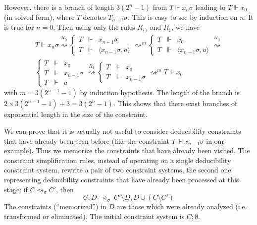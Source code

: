 \documentclass[acmtocl,acmnow]{acmtrans2m}
\newcommand{\simpl}{\rightsquigarrow}   \newcommand{\msimpl}{\rightsquigarrow}  \newcommand{\gsimpl}{\leadsto}
\newcommand{\dedsys}[1]{deducibility constraint system}
\newcommand{\dedconss}[1]{deducibility constraints}
\begin{document}
However, there is a branch of length $3(2^n-1)$ from $T\Vdash x_n\sigma$ leading to $T\Vdash x_0$ (in solved
form), where $T$ denotes $T_{n+1}\sigma$.
This is easy to see by induction on $n$.
It is true for $n = 0$. Then using only the rules
$R_{\langle\,\rangle}$ and $R_1$, we have
\begin{multline*}
T\Vdash x_{n}\sigma\stackrel{R_{\langle\rangle}}{\simpl}
\left\{\begin{array}{rcl}
T&\Vdash& x_{n-1}\sigma\\
T&\Vdash &\langle x_{n-1}\sigma,a\rangle
       \end{array}\right.
\simpl^m
\left\{\begin{array}{rcl}
T&\Vdash& x_{0}\\
T&\Vdash& \langle x_{n-1}\sigma,a\rangle
       \end{array}\right.
\stackrel{R_{\langle\rangle}}{\simpl}\\
\left\{\begin{array}{rcl}
T&\Vdash &x_{0}\\
T&\Vdash &x_{n-1}\sigma\\
T&\Vdash &a
       \end{array}\right.
\stackrel{R_{1}}{\simpl}
\left\{\begin{array}{rcl}
T&\Vdash &x_{0}\\
T&\Vdash &x_{n-1}\sigma
       \end{array}\right.
\simpl^m T\Vdash x_{0}
\end{multline*}
with $m= 3(2^{n-1}-1)$ by induction hypothesis. The length of the branch is
$2\times 3(2^{n-1}-1)+3= 3(2^{n}-1)$.
This shows that there exist branches of exponential length in the size
of the constraint.







\bigskip

We can prove that it is
actually not useful to consider \dedconss{} that have already been
seen before (like the constraint $T\Vdash x_{n-1}\sigma$ in our
example). Thus we memorize the constraints that have already been
visited. The constraint simplification rules, instead of operating
on a single \dedsys{}, rewrite a pair of two constraint systems,
the second one representing \dedconss{} that have already been 
processed at this stage: if $C\simpl_\sigma C'$, then
$$C;D\ \msimpl_{\sigma}\ C'\setminus D; D\cup(C\setminus C')$$ 
The constraints (``memorized'') in $D$ are those which were already analyzed (i.e. transformed or eliminated).
The initial constraint system  is $C;\emptyset$.
\end{document}
